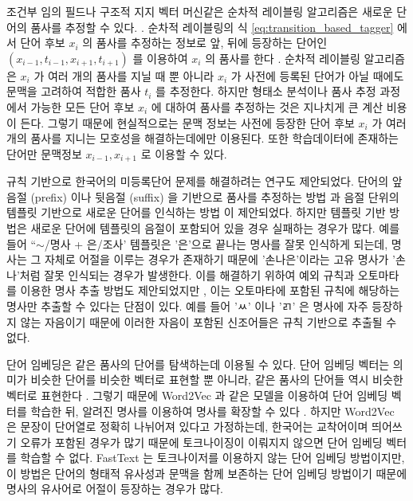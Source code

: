 \documentclass[11pt]{article}
\begin{document}
조건부 임의 필드나 구조적 지지 벡터 머신같은 순차적 레이블링 알고리즘은 새로운 단어의 품사를 추정할 수 있다. \citep{shim2004high, shim2007made, na2012crfs, lee2013joint}.
순차적 레이블링의 식 \ref{eq:transition_based_tagger} 에서 단어 후보 $x_i$ 의 품사를 추정하는 정보로 앞, 뒤에 등장하는 단어인 $(x_{i-1}, t_{i-1}, x_{i+1}, t_{i+1})$ 를 이용하여 $x_i$ 의 품사를 한다 \citep{shim2004high, shim2007made, na2012crfs, lee2013joint}.
순차적 레이블링 알고리즘은 $x_i$ 가 여러 개의 품사를 지닐 때 뿐 아니라 $x_i$ 가 사전에 등록된 단어가 아닐 때에도 문맥을 고려하여 적합한 품사 $t_i$ 를 추정한다.
하지만 형태소 분석이나 품사 추정 과정에서 가능한 모든 단어 후보 $x_i$ 에 대하여 품사를 추정하는 것은 지나치게 큰 계산 비용이 든다.
그렇기 때문에 현실적으로는 문맥 정보는 사전에 등장한 단어 후보 $x_i$ 가 여러 개의 품사를 지니는 모호성을 해결하는데에만 이용된다.
또한 학습데이터에 존재하는 단어만 문맥정보 $x_{i-1}, x_{i+1}$ 로 이용할 수 있다.

규칙 기반으로 한국어의 미등록단어 문제를 해결하려는 연구도 제안되었다.
단어의 앞음절 (prefix) 이나 뒷음절 (suffix) 을 기반으로 품사를 추정하는 방법 \citep{Lee2016functional} 과 음절 단위의 템플릿 기반으로 새로운 단어를 인식하는 방법 \citep{hong2008new} 이 제안되었다.
하지만 템플릿 기반 방법은 새로운 단어에 템플릿의 음절이 포함되어 있을 경우 실패하는 경우가 많다.
예를 들어 “$\sim$/명사 + 은/조사' 템플릿은 '은'으로 끝나는 명사를 잘못 인식하게 되는데, 명사는 그 자체로 어절을 이루는 경우가 존재하기 때문에 '손나은'이라는 고유 명사가 '손나'처럼 잘못 인식되는 경우가 발생한다.
이를 해결하기 위하여 예외 규칙과 오토마타를 이용한 명사 추출 방법도 제안되었지만 \citep{lee2003efficient}, 이는 오토마타에 포함된 규칙에 해당하는 명사만 추출할 수 있다는 단점이 있다.
예를 들어 'ㅆ' 이나 'ㄺ' 은 명사에 자주 등장하지 않는 자음이기 때문에 이러한 자음이 포함된 신조어들은 규칙 기반으로 추출될 수 없다.

단어 임베딩은 같은 품사의 단어를 탐색하는데 이용될 수 있다.
단어 임베딩 벡터는 의미가 비슷한 단어를 비슷한 벡터로 표현할 뿐 아니라, 같은 품사의 단어들 역시 비슷한 벡터로 표현한다 \citep{bengio2003neural}.
그렇기 때문에 Word2Vec 과 같은 모델을 이용하여 단어 임베딩 벡터를 학습한 뒤, 알려진 명사를 이용하여 명사를 확장할 수 있다 \citep{mikolov2013distributed} .
하지만 Word2Vec 은 문장이 단어열로 정확히 나뉘어져 있다고 가정하는데, 한국어는 교착어이며 띄어쓰기 오류가 포함된 경우가 많기 때문에 토크나이징이 이뤄지지 않으면 단어 임베딩 벡터를 학습할 수 없다.
FastText \citep{bojanowski2017enriching} 는 토크나이저를 이용하지 않는 단어 임베딩 방법이지만, 이 방법은 단어의 형태적 유사성과 문맥을 함께 보존하는 단어 임베딩 방법이기 때문에 명사의 유사어로 어절이 등장하는 경우가 많다.
\end{document}
